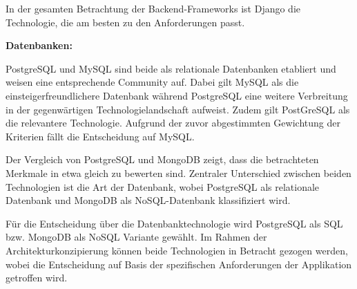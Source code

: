 In der gesamten Betrachtung der Backend-Frameworks ist Django die Technologie, die am besten zu den Anforderungen passt.

\textbf{Datenbanken:}

PostgreSQL und MySQL sind beide als relationale Datenbanken etabliert und weisen eine entsprechende Community auf.
Dabei gilt MySQL als die einsteigerfreundlichere Datenbank während PostgreSQL eine weitere Verbreitung in der gegenwärtigen Technologielandschaft aufweist.
Zudem gilt PostGreSQL als die relevantere Technologie.
Aufgrund der zuvor abgestimmten Gewichtung der Kriterien fällt die Entscheidung auf MySQL.

Der Vergleich von PostgreSQL und MongoDB zeigt, dass die betrachteten Merkmale in etwa gleich zu bewerten sind.
Zentraler Unterschied zwischen beiden Technologien ist die Art der Datenbank, wobei PostgreSQL als relationale Datenbank und MongoDB als NoSQL-Datenbank klassifiziert wird.

Für die Entscheidung über die Datenbanktechnologie wird PostgreSQL als SQL bzw. MongoDB als NoSQL Variante gewählt.
Im Rahmen der Architekturkonzipierung können beide Technologien in Betracht gezogen werden, wobei die Entscheidung auf Basis der spezifischen Anforderungen der Applikation getroffen wird.
